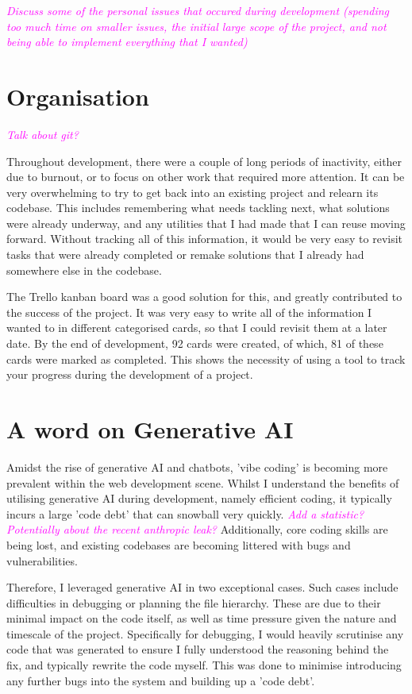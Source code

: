 \documentclass{report}
\begin{document}
\textcolor{magenta}{\textit{Discuss some of the personal issues that occured during development (spending too much time on smaller issues, the initial large scope of the project, and not being able to implement everything that I wanted)}}

\section{Organisation}

\textcolor{magenta}{\textit{Talk about git?}}

Throughout development, there were a couple of long periods of inactivity,
either due to burnout, or to focus on other work that required more attention.
It can be very overwhelming to try to get back into an existing project and relearn its codebase.
This includes remembering what needs tackling next, what solutions were already underway,
and any utilities that I had made that I can reuse moving forward.
Without tracking all of this information,
it would be very easy to revisit tasks that were already completed or remake solutions that I already had somewhere else in the codebase.

The Trello kanban board was a good solution for this, and greatly contributed to the success of the project.
It was very easy to write all of the information I wanted to in different categorised cards, so that I could revisit them at a later date.
By the end of development, 92 cards were created, of which, 81 of these cards were marked as completed.
This shows the necessity of using a tool to track your progress during the development of a project.

\section{A word on Generative AI}

Amidst the rise of generative AI and chatbots, 'vibe coding' is becoming more prevalent within the web development scene.
Whilst I understand the benefits of utilising generative AI during development, namely efficient coding,
it typically incurs a large 'code debt' that can snowball very quickly.
\textcolor{magenta}{\textit{Add a statistic? Potentially about the recent anthropic leak?}}
Additionally, core coding skills are being lost, and existing codebases are becoming littered with bugs and vulnerabilities.

Therefore, I leveraged generative AI in two exceptional cases.
Such cases include difficulties in debugging or planning the file hierarchy.
These are due to their minimal impact on the code itself, as well as time pressure given the nature and timescale of the project.
Specifically for debugging, I would heavily scrutinise any code that was generated to ensure I fully understood the reasoning behind the fix,
and typically rewrite the code myself.
This was done to minimise introducing any further bugs into the system and building up a 'code debt'.
\end{document}
